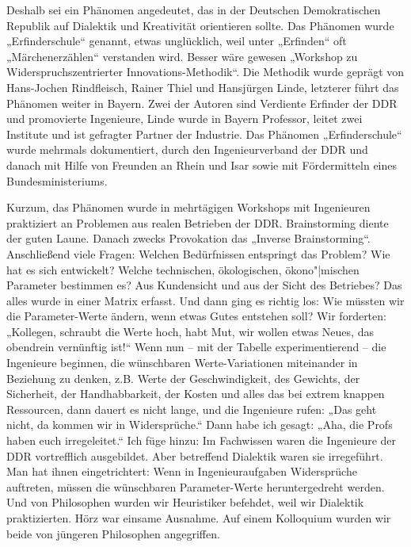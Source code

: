\documentclass[11pt,a4paper]{article}
\begin{document}
Deshalb sei ein Phänomen angedeutet, das in der Deutschen Demokratischen
Republik auf Dialektik und Kreativität orientieren sollte. Das Phänomen wurde
„Erfinderschule“ genannt, etwas unglücklich, weil unter „Erfinden“ oft
„Märchenerzählen“ verstanden wird. Besser wäre gewesen „Workshop zu
Widerspruchszentrierter Innovations-Methodik“. Die Methodik wurde geprägt von
Hans-Jochen Rindfleisch, Rainer Thiel und Hansjürgen Linde, letzterer führt
das Phänomen weiter in Bayern. Zwei der Autoren sind Verdiente Erfinder der
DDR und promovierte Ingenieure, Linde wurde in Bayern Professor, leitet zwei
Institute und ist gefragter Partner der Industrie. Das Phänomen
„Erfinderschule“ wurde mehrmals dokumentiert, durch den Ingenieurverband der
DDR und danach mit Hilfe von Freunden an Rhein und Isar sowie mit
Fördermitteln eines Bundesministeriums.

Kurzum, das Phänomen wurde in mehrtägigen Workshops mit Ingenieuren
praktiziert an Problemen aus realen Betrieben der DDR. Brainstorming diente
der guten Laune. Danach zwecks Provokation das „Inverse Brainstorming“.
Anschließend viele Fragen: Welchen Bedürfnissen entspringt das Problem? Wie
hat es sich entwickelt? Welche technischen, ökologischen, ökono"|mischen
Parameter bestimmen es? Aus Kundensicht und aus der Sicht des Betriebes? Das
alles wurde in einer Matrix erfasst. Und dann ging es richtig los: Wie müssten
wir die Parameter-Werte ändern, wenn etwas Gutes entstehen soll? Wir
forderten: „Kollegen, schraubt die Werte hoch, habt Mut, wir wollen etwas
Neues, das obendrein vernünftig ist!“ Wenn nun -- mit der Tabelle
experimentierend -- die Ingenieure beginnen, die wünschbaren Werte-Variationen
miteinander in Beziehung zu denken, z.B. Werte der Geschwindigkeit, des
Gewichts, der Sicherheit, der Handhabbarkeit, der Kosten und alles das bei
extrem knappen Ressourcen, dann dauert es nicht lange, und die Ingenieure
rufen: „Das geht nicht, da kommen wir in Widersprüche.“ Dann habe ich gesagt:
„Aha, die Profs haben euch irregeleitet.“ Ich füge hinzu: Im Fachwissen waren
die Ingenieure der DDR vortrefflich ausgebildet. Aber betreffend Dialektik
waren sie irregeführt. Man hat ihnen eingetrichtert: Wenn in Ingenieuraufgaben
Widersprüche auftreten, müssen die wünschbaren Parameter-Werte heruntergedreht
werden. Und von Philosophen wurden wir Heuristiker befehdet, weil wir
Dialektik praktizierten. Hörz war einsame Ausnahme. Auf einem Kolloquium
wurden wir beide von jüngeren Philosophen angegriffen.
\end{document}
